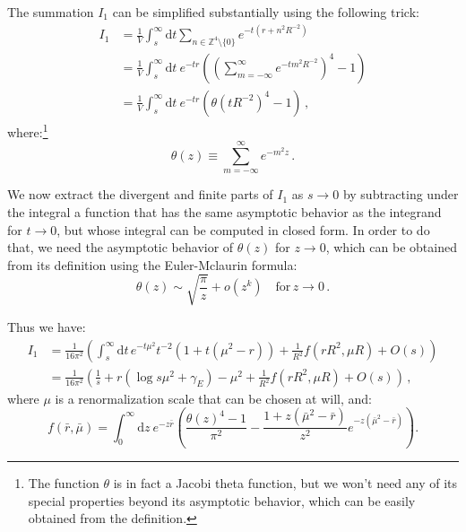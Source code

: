 \documentclass[11pt,a4paper]{article}
\newcommand{\dd}{\mathrm{d}}
\begin{document}
The summation $I_1$ can be simplified substantially using the following trick:
\begin{equation}
\begin{split}
    I_1 &= \frac{1}{V} \int_{s}^{\infty} \dd t \sum_{n\in\mathbb{Z}^4\setminus\{0\}} 
    e^{-t(r + n^2 R^{-2})}\\
    & = \frac{1}{V} \int_{s}^{\infty} \dd t\ e^{-t r}
        \left(\left(\sum_{m = -\infty}^{\infty} e^{-t m^2 R^{-2}}\right)^4 - 1\right) \\
    & = \frac{1}{V} \int_{s}^{\infty} \dd t\ e^{-t r}
        \left(\theta\!\left(t R^{-2}\right)^4 - 1\right)\,,
\end{split}
\end{equation}
where:\footnote{The function $\theta$ is in fact a Jacobi theta function, but we
won't need any of its special properties beyond its asymptotic behavior, which
can be easily obtained from the definition.}
\begin{equation}
    \label{eq:theta}
    \theta(z) \equiv \sum_{m = -\infty}^{\infty} e^{-m^2 z}\,.
\end{equation}

We now extract the divergent and finite parts of $I_1$ as $s\to 0$ by
subtracting under the integral a function that has the same asymptotic behavior
as the integrand for $t \to 0$, but whose integral can be computed in closed
form. In order to do that, we need the asymptotic behavior of $\theta(z)$ for
$z\to0$, which can be obtained from its definition using the Euler-Mclaurin
formula:
\begin{equation}
    \theta(z) \sim \sqrt{\frac{\pi}{z}} + o(z^k) \quad\mathrm{for}\, z\to0\,.
\end{equation}

Thus we have:
\begin{equation}
\begin{split}
    I_1 &= \frac{1}{16\pi^2}\left(\int_{s}^{\infty}\dd t\, e^{-t \mu^2} t^{-2}\left(1 + t (\mu^2 - r)\right)
    +\frac{1}{R^2} f(r R^2, \mu R) + O(s)\right)\\
    &= \frac{1}{16\pi^2}\left(\frac{1}{s} + r\left(\log s\mu^2 + \gamma_{E}\right) - 
    \mu^2 +\frac{1}{R^2} f(r R^2, \mu R) + O(s)\right)\,,
\end{split}
\end{equation}
where $\mu$ is a renormalization scale that can be chosen at will, and:
\begin{equation}
    \label{eq:f_definition}
    f(\bar{r},\bar{\mu}) = \int_{0}^{\infty} \dd z\ e^{-z \bar{r}} \left(\frac{\theta(z)^4 - 1}{\pi^2} - 
    \frac{1 + z\left(\bar{\mu}^2 - \bar{r}\right)}{z^2}e^{-z\left(\bar{\mu}^2 - \bar{r}\right)}\right).
\end{equation}
\end{document}

